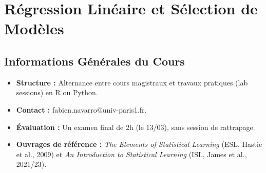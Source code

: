\chapter{Régression Linéaire et Sélection de Modèles}
\section{Informations Générales du Cours}
\begin{itemize}
    \item \textbf{Structure :} Alternance entre cours magistraux et travaux pratiques (lab sessions) en R ou Python.
    \item \textbf{Contact :} fabien.navarro@univ-paris1.fr.
    \item \textbf{Évaluation :} Un examen final de 2h (le 13/03), sans session de rattrapage.
    \item \textbf{Ouvrages de référence :} \textit{The Elements of Statistical Learning} (ESL, Hastie et al., 2009)  et \textit{An Introduction to Statistical Learning} (ISL, James et al., 2021/23).
\end{itemize}

